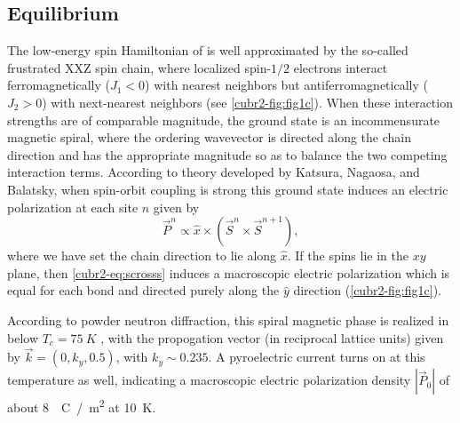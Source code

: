 \subsection{Equilibrium}
The low-energy spin Hamiltonian of  is well approximated by the so-called frustrated \oned XXZ spin chain, where localized spin-$1/2$ electrons interact ferromagnetically ($J_1 < 0$) with nearest neighbors but antiferromagnetically ($J_2 > 0$) with next-nearest neighbors (see \cref{cubr2-fig:fig1c}).
When these interaction strengths are of comparable magnitude, the ground state is an incommensurate magnetic spiral, where the ordering wavevector is directed along the chain direction and has the appropriate magnitude so as to balance the two competing interaction terms.
According to theory developed by Katsura, Nagaosa, and Balatsky\cite{katsura_spin_2005}, when spin-orbit coupling is strong this ground state induces an electric polarization at each site $n$ given by
\begin{equation}\label{cubr2-eq:scrosss}
\vec{P}^n \propto \hat{x}\times(\vec{S}^{n} \times \vec{S}^{n+1}),
\end{equation}
where we have set the chain direction to lie along $\hat{x}$.
If the spins lie in the $xy$ plane, then \cref{cubr2-eq:scrosss} induces a macroscopic electric polarization which is equal for each bond and directed purely along the $\hat{y}$ direction (\cref{cubr2-fig:fig1c}).

According to powder neutron diffraction, this spiral magnetic phase is realized in  below $T_c=\qty{75}{K}$ \cite{zhao_cubr2_2012,wang_nmr_2018,zhao_pressure_2019,
zhang_giant_2020}, with the propogation vector (in reciprocal lattice units) given by $\vec{k} = (0, k_y, 0.5)$, with $k_y\sim 0.235$\cite{zhao_cubr2_2012,lee_investigation_2012}.
A pyroelectric current turns on at this temperature as well, indicating a macroscopic electric polarization density $|\vec{P}_0|$ of about \qty{8}{\mu C / m^2} at \qty{10}{K}\cite{zhao_cubr2_2012}.

